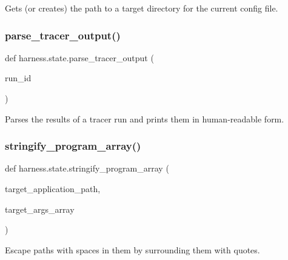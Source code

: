 \begin{DoxyVerb}Gets (or creates) the path to a target directory for the current
config file.
\end{DoxyVerb}
 \mbox{\label{namespaceharness_1_1state_a2c5e55fbbbe7646470ac7d81d92e568a}} 
\subsubsection{\texorpdfstring{parse\+\_\+tracer\+\_\+output()}{parse\_tracer\_output()}}
{\footnotesize\ttfamily def harness.\+state.\+parse\+\_\+tracer\+\_\+output (\begin{DoxyParamCaption}\item[{}]{run\+\_\+id }\end{DoxyParamCaption})}

\begin{DoxyVerb}Parses the results of a tracer run and prints them in
human-readable form.
\end{DoxyVerb}
 \mbox{\label{namespaceharness_1_1state_a3cc070e2cac5c2a3d7160e515c8d69d1}} 
\subsubsection{\texorpdfstring{stringify\+\_\+program\+\_\+array()}{stringify\_program\_array()}}
{\footnotesize\ttfamily def harness.\+state.\+stringify\+\_\+program\+\_\+array (\begin{DoxyParamCaption}\item[{}]{target\+\_\+application\+\_\+path,  }\item[{}]{target\+\_\+args\+\_\+array }\end{DoxyParamCaption})}

\begin{DoxyVerb}Escape paths with spaces in them by surrounding them with quotes.
\end{DoxyVerb}
 \mbox{\label{namespaceharness_1_1state_a1010624bc065ff8834c87b5d32771462}} 
